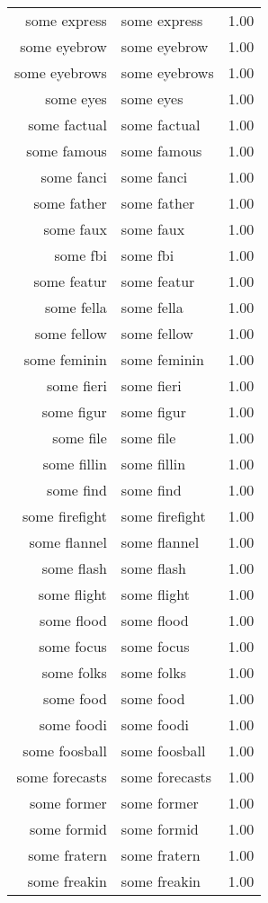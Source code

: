 \begin{table}[ht]
\begin{tabular}{rlr}
  some express & some express & 1.00 \\ 
  some eyebrow & some eyebrow & 1.00 \\ 
  some eyebrows & some eyebrows & 1.00 \\ 
  some eyes & some eyes & 1.00 \\ 
  some factual & some factual & 1.00 \\ 
  some famous & some famous & 1.00 \\ 
  some fanci & some fanci & 1.00 \\ 
  some father & some father & 1.00 \\ 
  some faux & some faux & 1.00 \\ 
  some fbi & some fbi & 1.00 \\ 
  some featur & some featur & 1.00 \\ 
  some fella & some fella & 1.00 \\ 
  some fellow & some fellow & 1.00 \\ 
  some feminin & some feminin & 1.00 \\ 
  some fieri & some fieri & 1.00 \\ 
  some figur & some figur & 1.00 \\ 
  some file & some file & 1.00 \\ 
  some fillin & some fillin & 1.00 \\ 
  some find & some find & 1.00 \\ 
  some firefight & some firefight & 1.00 \\ 
  some flannel & some flannel & 1.00 \\ 
  some flash & some flash & 1.00 \\ 
  some flight & some flight & 1.00 \\ 
  some flood & some flood & 1.00 \\ 
  some focus & some focus & 1.00 \\ 
  some folks & some folks & 1.00 \\ 
  some food & some food & 1.00 \\ 
  some foodi & some foodi & 1.00 \\ 
  some foosball & some foosball & 1.00 \\ 
  some forecasts & some forecasts & 1.00 \\ 
  some former & some former & 1.00 \\ 
  some formid & some formid & 1.00 \\ 
  some fratern & some fratern & 1.00 \\ 
  some freakin & some freakin & 1.00 \\ 

\end{tabular}
\end{table}
